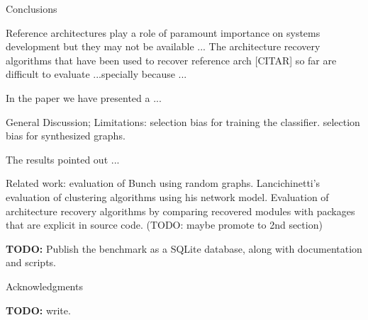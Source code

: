 \documentclass[11pt,twocolumn,a4paper,english]{article}
\newcommand{\TODO}{\textbf{TODO:} }
\begin{document}

\begin{section}{Conclusions}

Reference architectures play a role of paramount importance on systems development but they may not be available ...
The architecture recovery algorithms that have been used to recover reference arch [CITAR] so far are difficult to evaluate ...specially because ...

In the paper we have presented a ...

General Discussion; Limitations: selection bias for training the classifier. selection bias for synthesized graphs.

The results pointed out ...
	

	Related work: evaluation of Bunch using random graphs. Lancichinetti's evaluation of clustering algorithms using his network model. Evaluation of architecture recovery algorithms by comparing recovered modules with packages that are explicit in source code. (TODO: maybe promote to 2nd section)
	
	\TODO Publish the benchmark as a SQLite database, along with documentation and scripts.
	
\end{section}

\begin{section}{Acknowledgments}

\TODO write.

\end{section}




\end{document}
